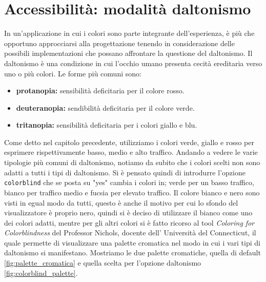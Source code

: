 \documentclass[binding=0.6cm]{sapthesis}
\begin{document}
\section{Accessibilità: modalità daltonismo}
\label{sec:accessibilità}
In un'applicazione in cui i colori sono parte integrante dell'esperienza, è più che opportuno approcciarsi alla progettazione tenendo
in considerazione delle possibili implementazioni che possano affrontare la questione del daltonismo. 
Il daltonismo è una condizione in cui l'occhio umano presenta cecità ereditaria verso uno o più colori. Le forme più comuni sono:
\begin{itemize}
    \item \textbf{protanopia:} sensibilità deficitaria per il colore rosso.
    \item \textbf{deuteranopia:} sendibilità deficitaria per il colore verde.
    \item \textbf{tritanopia:} sensibilità deficitaria per i colori giallo e blu.
\end{itemize}
Come detto nel capitolo precedente, utilizziamo
i colori verde, giallo e rosso per esprimere rispettivamente basso, medio e alto traffico. Andando a vedere le varie tipologie più comuni di daltonismo, 
notiamo da subito che i colori scelti non sono adatti a tutti i tipi di daltonismo. Si è pensato quindi di introdurre l'opzione
\texttt{colorblind} che se posta su "yes" cambia i colori in; verde per un basso traffico, bianco per traffico medio e fucsia per elevato traffico.
Il colore bianco e nero sono visti in egual modo da tutti, questo è anche il motivo per cui lo sfondo del visualizzatore è proprio nero, quindi si è
deciso di utilizzare il bianco come uno dei colori adatti, mentre per gli altri colori si è fatto ricorso al tool \textit{Coloring for Colorblindness} \cite{ColorBlindPalette2024} 
del Professor Nichols, docente dell' Università del Connecticut, il quale permette di visualizzare una palette cromatica nel modo in cui i vari tipi
di daltonismo si manifestano. Mostriamo le due palette cromatiche, quella di default \ref{fig:palette_cromatica} e quella scelta per l'opzione daltonismo \ref{fig:colorblind_palette}.
\end{document}
